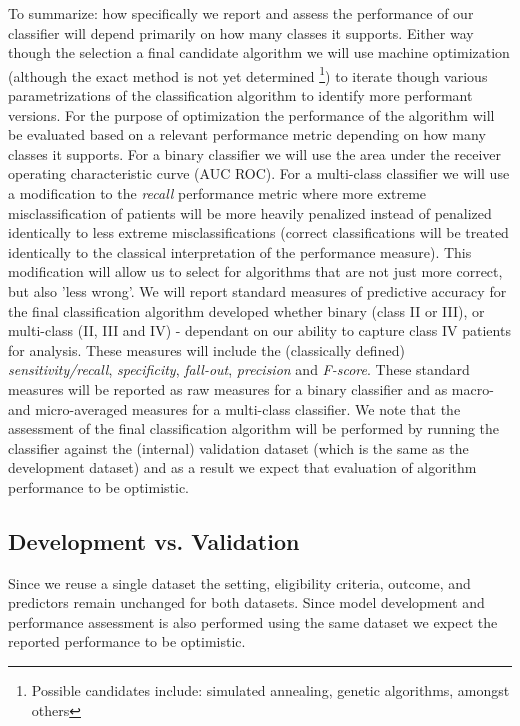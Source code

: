 \documentclass[]{article}
\begin{document}
To summarize: how specifically we report and assess the performance of our classifier will depend primarily on how many classes it supports. Either way though the selection a final candidate algorithm we will use machine optimization (although the exact method is not yet determined \footnote{Possible candidates include: simulated annealing, genetic algorithms, amongst others\cite{Segaran2007}}) to iterate though various parametrizations of the classification algorithm to identify more performant versions. For the purpose of optimization the performance of the algorithm will be evaluated based on a relevant performance metric depending on how many classes it supports. For a binary classifier we will use the area under the receiver operating characteristic curve (AUC ROC). For a multi-class classifier we will use a modification to the \textit{recall} performance metric where more extreme misclassification of patients will be more heavily penalized instead of penalized identically to less extreme misclassifications (correct classifications will be treated identically to the classical interpretation of the performance measure). This modification will allow us to select for algorithms that are not just more correct, but also 'less wrong'. We will report standard measures of predictive accuracy for the final classification algorithm developed whether binary (class II or III), or multi-class (II, III and IV) - dependant on our ability to capture class IV patients for analysis. These measures will include the (classically defined) \textit{sensitivity/recall}, \textit{specificity}, \textit{fall-out}, \textit{precision} and \textit{F-score}. These standard measures will be reported as raw measures for a binary classifier and as macro- and micro-averaged measures for a multi-class classifier. We note that the assessment of the final classification algorithm will be performed by running the classifier against the (internal) validation dataset (which is the same as the development dataset) and as a result we expect that evaluation of algorithm performance to be optimistic. 



\subsection{Development vs. Validation} %

Since we reuse a single dataset the setting, eligibility criteria, outcome, and predictors remain unchanged for both datasets. Since model development and performance assessment is also performed using the same dataset we expect the reported performance to be optimistic. 
\end{document}
